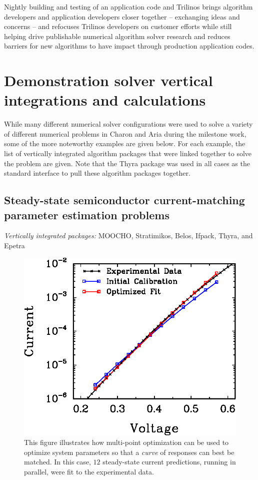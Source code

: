 \documentclass[pdf,ps2pdf,11pt]{SANDreport}
\begin{document}
Nightly building and testing of an application code and Trilinos
brings algorithm developers and application developers closer together --
exchanging ideas and concerns -- and refocuses Trilinos developers on customer 
efforts while still helping drive publishable numerical algorithm solver
research and reduces barriers for new algorithms to have impact through
production application codes.



%
\section{Demonstration solver vertical integrations and calculations}
\label{sec:demonstration}
%

While many different numerical solver configurations were used to solve a
variety of different numerical problems in Charon and Aria during the
milestone work, some of the more noteworthy examples are given below.  For each
example, the list of vertically integrated algorithm packages that were
linked together to solve the problem are given.  Note that the Thyra package
was used in all cases as the standard interface to pull these algorithm
packages together.

%
\subsection{Steady-state semiconductor current-matching parameter
estimation problems}
%

{}\noindent\textit{Vertically integrated packages:} MOOCHO, Stratimikos,
Belos, Ifpack, Thyra, and Epetra

{\bsinglespace
\begin{figure}
\begin{center}
\includegraphics*[angle=0,scale=0.80,width=0.50\linewidth
]{multiPointFit}
\end{center}
\caption[Multipoint current-matching parameter estimation solution against experimental data]{
\label{fig:multiPointFit}
This figure illustrates how multi-point optimization can be used to optimize
system parameters so that a {\em curve} of responses can best be matched. In
this case, $12$ steady-state current predictions, running in parallel, were
fit to the experimental data.}
\end{figure}
\esinglespace}
\end{document}
